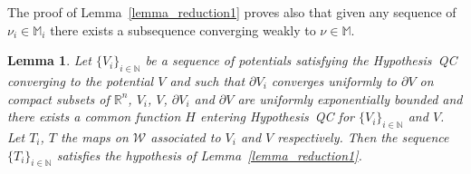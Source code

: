 \documentclass[a4paper,10pt]{article}
\newtheorem{lemma}{Lemma}
\begin{document}
\begin{remark}
  \label{remark_reduction1}The proof of Lemma~\ref{lemma_reduction1} proves
  also that given any sequence of $\nu_i \in \mathbb{M}_i$ there exists a
  subsequence converging weakly to $\nu \in \mathbb{M}$.
\end{remark}

\begin{lemma}
  \label{lemma_reduction2}Let $\{ V_i \}_{i \in \mathbb{N}}$ be a sequence of
  potentials satisfying the Hypothesis~QC converging to the potential $V$ and
  such that $\partial V_i$ converges uniformly to $\partial V$ on compact
  subsets of $\mathbb{R}^n$, $V_i$, $V$, $\partial V_i$ and $\partial V$ are
  uniformly exponentially bounded and there exists a common function $H$
  entering Hypothesis~QC for $\{ V_i \}_{i \in \mathbb{N}}$ and $V$. Let
  $T_i$, $T$ the maps on $\mathcal{W}$ associated to $V_i$ and $V$
  respectively. Then the sequence $\{ T_i \}_{i \in \mathbb{N}}$ satisfies the
  hypothesis of Lemma~\ref{lemma_reduction1}. \ 
\end{lemma}
\end{document}
